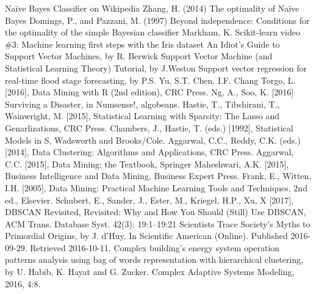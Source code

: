 \begin{thebibliography}{99}
 Naïve Bayes Classifier on Wikipedia
 Zhang, H. (2014) The optimality of Naïve Bayes
 Domings, P., and Pazzani, M. (1997) Beyond independence: Conditions for the optimality of the simple Bayesian classifier
 Markham, K. Scikit-learn video \#3: Machine learning first steps with the Iris dataset 
 
 
 
 An Idiot's Guide to Support Vector Machines, by R. Berwick
 Support Vector Machine (and Statistical Learning Theory) Tutorial, by J.Weston
 Support vector regression for real-time flood stage forecasting, by P.S. Yu, S.T. Chen, I.F. Chang
 Torgo, L. [2016], Data Mining with R (2nd edition), CRC Press. 
 Ng, A., Soo, K. [2016] Surviving a Disaster, in Numsense!, algobeans. 
 Hastie, T., Tibshirani, T., Wainwright, M. [2015], Statistical Learning with Sparsity: The Lasso and Genarlizations, CRC Press. 
 Chambers, J., Hastie, T. (eds.) [1992], Statistical Models in S, Wadsworth and Brooks/Cole.
 Aggarwal, C.C., Reddy, C.K. (eds.) [2014], Data Clustering: Algorithms and Applications, CRC Press.
 Aggarwal, C.C. [2015], Data Mining: the Textbook, Springer
 Maheshwari, A.K. [2015], Business Intelligence and Data Mining, Business Expert Press.
 Frank, E., Witten, I.H. [2005], Data Mining: Practical Machine Learning Tools and Techniques, 2nd ed., Elsevier.
 Schubert, E., Sander, J., Ester, M., Kriegel, H.P., Xu, X [2017], DBSCAN Revisited, Revisited: Why and How You Should (Still) Use DBSCAN, ACM Trans. Database Syst. 42(3): 19:1--19:21
 Scientists Trace Society's Myths to Primordial Origins, by J. d'Huy. In Scientific American (Online). Published 2016-09-29. Retrieved 2016-10-11.
 Complex building's energy system operation patterns analysis using bag of words representation with hierarchical clustering, by U. Habib, K. Hayat and G. Zucker. Complex Adaptive Systems Modeling, 2016, 4:8.

\end{thebibliography}
